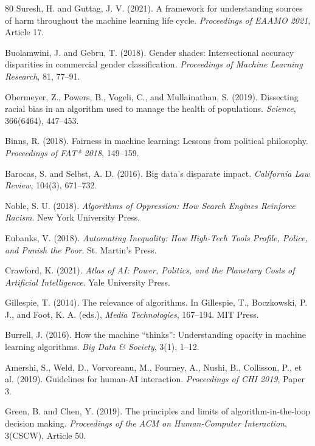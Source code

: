 \documentclass[11pt,a4paper]{article}
\begin{document}
\begin{thebibliography}{80}
Suresh, H. and Guttag, J. V. (2021). A framework for understanding sources of harm throughout the machine learning life cycle. \textit{Proceedings of EAAMO 2021}, Article 17.

Buolamwini, J. and Gebru, T. (2018). Gender shades: Intersectional accuracy disparities in commercial gender classification. \textit{Proceedings of Machine Learning Research}, 81, 77--91.

Obermeyer, Z., Powers, B., Vogeli, C., and Mullainathan, S. (2019). Dissecting racial bias in an algorithm used to manage the health of populations. \textit{Science}, 366(6464), 447--453.

Binns, R. (2018). Fairness in machine learning: Lessons from political philosophy. \textit{Proceedings of FAT* 2018}, 149--159.

Barocas, S. and Selbst, A. D. (2016). Big data's disparate impact. \textit{California Law Review}, 104(3), 671--732.

Noble, S. U. (2018). \textit{Algorithms of Oppression: How Search Engines Reinforce Racism}. New York University Press.

Eubanks, V. (2018). \textit{Automating Inequality: How High-Tech Tools Profile, Police, and Punish the Poor}. St. Martin's Press.

Crawford, K. (2021). \textit{Atlas of AI: Power, Politics, and the Planetary Costs of Artificial Intelligence}. Yale University Press.

Gillespie, T. (2014). The relevance of algorithms. In Gillespie, T., Boczkowski, P. J., and Foot, K. A. (eds.), \textit{Media Technologies}, 167--194. MIT Press.

Burrell, J. (2016). How the machine ``thinks'': Understanding opacity in machine learning algorithms. \textit{Big Data \& Society}, 3(1), 1--12.

Amershi, S., Weld, D., Vorvoreanu, M., Fourney, A., Nushi, B., Collisson, P., et al. (2019). Guidelines for human-AI interaction. \textit{Proceedings of CHI 2019}, Paper 3.

Green, B. and Chen, Y. (2019). The principles and limits of algorithm-in-the-loop decision making. \textit{Proceedings of the ACM on Human-Computer Interaction}, 3(CSCW), Article 50.


\end{thebibliography}
\end{document}
